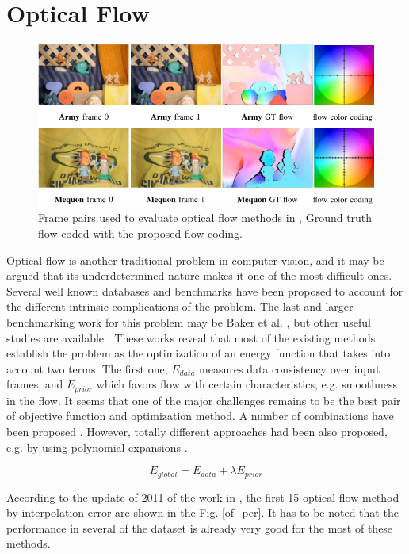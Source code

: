 \section{Optical Flow}

   \begin{figure}[thpb]
      \centering
      \includegraphics[width=1.0\textwidth]{../images/of_db.png}
      \caption{Frame pairs used to evaluate optical flow methods in \cite{c17}, Ground truth flow coded with the proposed flow coding. }
      \label{tr_db}
   \end{figure}

Optical flow is another traditional problem in computer vision, and it may be argued that its underdetermined nature makes it one of the most difficult ones. 
Several well known databases and benchmarks have been proposed to account for the different intrinsic complications of the problem. The last and larger benchmarking 
work for this problem may be Baker et al. \cite{c17}, but other useful studies are available \cite{c27}. 
These works reveal that most of the existing methods establish the problem as the optimization of an energy function that takes into account two terms. The first one, $E_{data}$ 
measures data consistency over input frames, and $E_{prior}$ which favors flow with certain characteristics, e.g. smoothness in the flow. It seems that one of the major 
challenges remains to be the best pair of objective function and optimization method. A number of combinations have been proposed \cite{c29}\cite{c30}\cite{c32}. However, 
totally different approaches had been also proposed, e.g. by using polynomial expansions \cite{c28}.

\begin{equation}
E_{global} = E_{data} + \lambda E_{prior}
\label{eq_ener}
\end{equation}

According to the update of 2011 of the work in \cite{c17}, the first 15 optical flow method by interpolation error are shown in the Fig. \ref{of_per}. It has to be noted that the performance in several of the dataset is already very good for the most of these methods.

